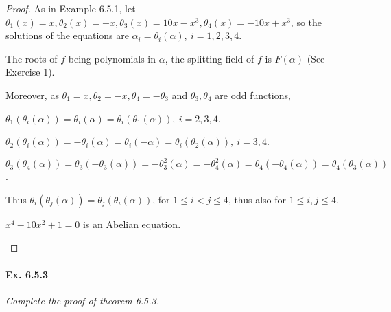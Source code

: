 \documentclass[11pt,a4paper]{article}
\begin{document}
\begin{proof}
As in Example 6.5.1, let $\theta_1(x) = x, \theta_2(x) = -x, \theta_3(x) = 10x-x^3,\theta_4(x) = -10x+x^3$, so the solutions of the equations are $\alpha_i = \theta_i(\alpha), \ i=1,2,3,4$.

The roots of $f$ being polynomials in $\alpha$, the splitting field of $f$ is $F(\alpha)$ (See  Exercise 1).

Moreover, as $\theta_1 = x, \theta_2 = -x, \theta_4 = -\theta_3$ and $\theta_3,\theta_4$ are odd functions,

 $\theta_1(\theta_i(\alpha)) = \theta_i(\alpha) = \theta_i(\theta_1(\alpha)),\ i=2,3,4$.

$\theta_2(\theta_i(\alpha)) = - \theta_i(\alpha) = \theta_i(-\alpha) = \theta_i(\theta_2(\alpha)),\ i=3,4$.

$\theta_3(\theta_4(\alpha)) = \theta_3(-\theta_3(\alpha)) = -\theta_3^2(\alpha) = -\theta_4^2(\alpha) = \theta_4(-\theta_4(\alpha)) = \theta_4(\theta_3(\alpha))$.

Thus $\theta_i(\theta_j(\alpha)) = \theta_j(\theta_i(\alpha))$, for $1\leq i <j\leq 4$, thus also for $1\leq i,j\leq 4$.
\begin{center}
$x^4-10x^2+1 = 0$ is an Abelian equation.
\end{center}
\end{proof}

\paragraph{Ex. 6.5.3}

{\it Complete the proof of theorem 6.5.3.
}
\end{document}
